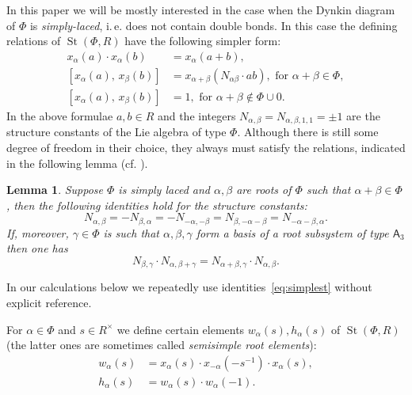 \documentclass[oneside, 8pt]{amsart}
\newtheorem{lemma}{Lemma}
\theoremstyle{remark}
\theoremstyle{definition}
\numberwithin{lemma}{section}
\numberwithin{prop}{section}
\numberwithin{corollary}{section}
\numberwithin{externaltheorem}{section}
\DeclareMathOperator{\St}{St}
\newcommand{\rA}{\mathsf{A}}
\numberwithin{equation}{section}
\begin{document}
In this paper we will be mostly interested in the case when the Dynkin diagram of $\Phi$ is {\it simply-laced}, i.\,e. does not contain double bonds. In this case the defining relations of $\St(\Phi, R)$ have the following simpler form:
\begin{align}
x_{\alpha}(a)\cdot x_{\alpha}(b)&=x_{\alpha}(a+b), \tag{R1} \label{Steinberg-additivity}\\
[x_{\alpha}(a),\,x_{\beta}(b)]  &=x_{\alpha+\beta}(N_{\alpha\beta} \cdot ab),\text{ for }\alpha+\beta\in\Phi, \tag{R2} \label{Chevalley-CCF1} \\
[x_{\alpha}(a),\,x_{\beta}(b)]  &=1,\text{ for }\alpha+\beta\not\in\Phi\cup0. \tag{R3} \label{Chevalley-CCF2}
\end{align}
In the above formulae $a, b \in R$ and the integers $N_{\alpha, \beta} = N_{\alpha, \beta, 1, 1} = \pm 1$ are the structure constants of the Lie algebra of type $\Phi$. Although there is still some degree of freedom in their choice, they always must satisfy the relations, indicated in the following lemma (cf. \cite[\S~14]{VP}).
\begin{lemma} Suppose $\Phi$ is simply laced and $\alpha, \beta$ are roots of $\Phi$ such that $\alpha+\beta\in \Phi$, then the following identities hold for the structure constants:
\begin{equation} \label{eq:simplest} N_{\alpha, \beta} = -N_{\beta,\alpha} = - N_{-\alpha, -\beta} = N_{\beta, -\alpha-\beta} = N_{-\alpha-\beta, \alpha}. \end{equation}
If, moreover, $\gamma \in \Phi$ is such that $\alpha,\beta,\gamma$ form a basis of a root subsystem of type $\rA_3$ then one has
\begin{equation} \label{eq:cocycle} N_{\beta,\gamma} \cdot N_{\alpha, \beta+\gamma} = N_{\alpha+\beta, \gamma} \cdot N_{\alpha, \beta}. \end{equation} \end{lemma}
In our calculations below we repeatedly use identities~\eqref{eq:simplest} without explicit reference.

For $\alpha\in\Phi$ and $s \in R^\times$ we define certain elements $w_\alpha(s), h_\alpha(s)$ of $\St(\Phi, R)$ (the latter ones are sometimes called {\it semisimple root elements}):
\begin{align*} w_\alpha(s) & =  x_\alpha(s) \cdot x_{-\alpha}(-s^{-1}) \cdot x_\alpha(s), \\ h_\alpha(s) & =  w_\alpha(s) \cdot w_\alpha(-1).  \end{align*}
\end{document}
